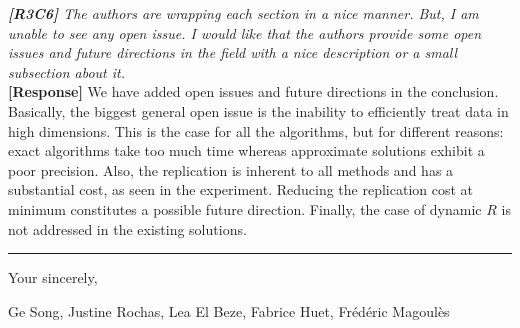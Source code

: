 \documentclass[11pt]{letter}
\newcommand{\svs}{\vspace{0.36ex}}
\newcommand{\TODO}[1]{\textcolor{red}{\textbf{[TODO:#1]}}}
\begin{document}

\svs
\noindent
{\em
{\bf [R3C6]}
 The authors are wrapping each section in a nice manner. But, I am unable to see any open issue. I would like that the 
 authors provide some open issues and future directions in the field with a nice description or a small subsection 
 about it.}\\
\textbf{[Response]} 
We have added open issues and future directions in the conclusion.
Basically, the biggest general open issue is the inability to efficiently treat data in high dimensions. This is the 
case for all the algorithms, but for different reasons: exact algorithms take too much time whereas approximate 
solutions exhibit a poor precision.
Also, the replication is inherent to all methods and has a substantial cost, as seen in the experiment. Reducing the 
replication cost at minimum constitutes a possible future direction. Finally, the case of dynamic $R$ is not addressed
in the existing solutions.

\vspace{3.6ex}
\hrule
\vspace{3.6ex}
\closing{Your sincerely,}

\vspace{-8ex}
Ge Song, Justine Rochas, Lea El Beze, Fabrice Huet, Fr\'ed\'eric Magoul\`es
\end{document}
